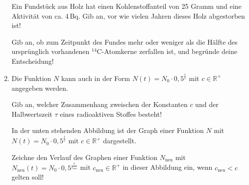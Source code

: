 \begin{langesbeispiel}
\begin{enumerate}
	Ein Fundstück aus Holz hat einen Kohlenstoffanteil von 25 Gramm und eine Aktivität von ca. 4\,Bq. Gib an, vor wie vielen Jahren dieses Holz abgestorben ist!\leer
	
	Gib an, ob zum Zeitpunkt des Fundes mehr oder weniger als die Hälfte des ursprünglich vorhandenen $^{14}$C-Atomkerne zerfallen ist, und begründe deine 			Entscheidung!\leer

	\item Die Funktion $N$ kann auch in der Form $N(t)=N_0\cdot 0,5^{\frac{t}{c}}$ mit $c\in\mathbb{R}^+$ angegeben werden.\leer
	
	 Gib an, welcher Zusammenhang zweischen der Konstanten $c$ und der Halbwertszeit $\tau$ eines radioaktiven Stoffes besteht!\leer
	
	In der unten stehenden Abbildung ist der Graph einer Funktion $N$ mit $N(t)=N_0\cdot 0,5^{\frac{t}{c}}$ mit $c\in\mathbb{R}^+$ dargestellt.
	
	Zeichne den Verlauf des Graphen einer Funktion $N_{\text{neu}}$ mit $N_{\text{neu}}(t)=N_0\cdot 0,5^{\frac{t}{c_{\text{neu}}}}$ mit $c_{\text{neu}}\in\mathbb{R}^+$ in dieser Abbildung ein, wenn $c_{\text{neu}}<c$ gelten soll!
		
		\begin{center}
		\end{center}
	\end{enumerate}

\end{langesbeispiel}
